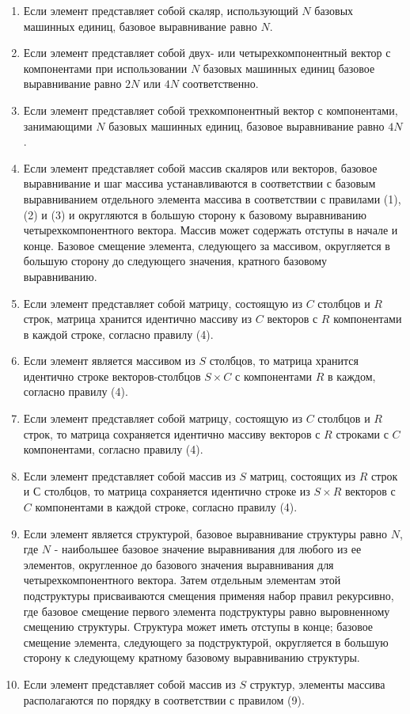 \begin{enumerate}[label=\arabic*), labelsep=0.5em]
    \item Если элемент представляет собой скаляр, использующий \(N\) базовых машинных единиц,
    базовое выравнивание равно \(N\).
    \item Если элемент представляет собой двух- или четырехкомпонентный вектор с компонентами
    при использовании \(N\) базовых машинных единиц базовое выравнивание равно \(2N\) или
    \(4N\) соответственно.
    \item Если элемент представляет собой трехкомпонентный вектор с компонентами, занимающими
    \(N\) базовых машинных единиц, базовое выравнивание равно \(4N\).
    \item Если элемент представляет собой массив скаляров или векторов, базовое выравнивание
    и шаг массива устанавливаются в соответствии с базовым выравниванием отдельного элемента массива
    в соответствии с правилами (1), (2) и (3) и округляются в большую сторону
    к базовому выравниванию четырехкомпонентного вектора. Массив может содержать отступы в начале
    и конце. Базовое смещение элемента, следующего за массивом, округляется в большую сторону
    до следующего значения, кратного базовому выравниванию.
    \item Если элемент представляет собой матрицу, состоящую из \(C\) столбцов и \(R\)
    строк, матрица хранится идентично массиву из \(C\)
    векторов с \(R\) компонентами в каждой строке, согласно правилу (4).
    \item Если элемент является массивом из \(S\) столбцов, то матрица хранится идентично строке векторов-столбцов \(S \times C\) с
    компонентами \(R\) в каждом, согласно правилу (4).
    \item Если элемент представляет собой матрицу, состоящую из \(C\) столбцов и \(R\) строк,
    то матрица сохраняется идентично массиву векторов с \(R\) строками с \(C\) компонентами,
    согласно правилу (4).
    \item Если элемент представляет собой массив из \(S\) матриц, состоящих из \(R\) строк
    и \(С\) столбцов, то матрица сохраняется идентично строке из \(S \times R\)
    векторов с \(C\) компонентами в каждой строке, согласно правилу (4).
    \item Если элемент является структурой, базовое выравнивание структуры равно
    \(N\), где \(N\) - наибольшее базовое значение выравнивания для любого из ее элементов,
    округленное до базового значения выравнивания для четырехкомпонентного вектора. Затем отдельным
    элементам этой подструктуры присваиваются смещения применяя набор правил рекурсивно,
    где базовое смещение первого элемента подструктуры равно выровненному смещению структуры.
    Структура может иметь отступы в конце; базовое смещение элемента, следующего за подструктурой,
    округляется в большую сторону к следующему кратному базовому выравниванию структуры.
    \item Если элемент представляет собой массив из \(S\) структур, элементы
    массива располагаются по порядку в соответствии с правилом (9).
\end{enumerate}

